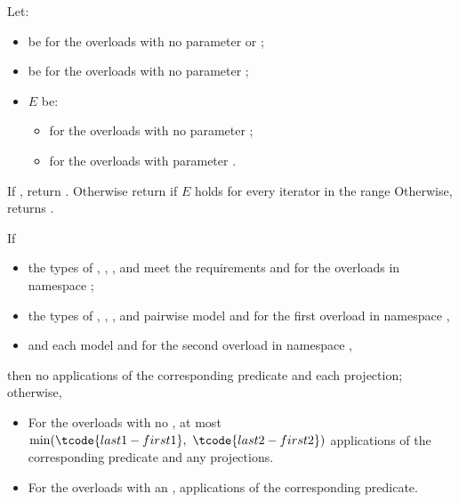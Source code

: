 \begin{itemdescr}
\pnum
Let:
\begin{itemize}
\item
   be 
  for the overloads with no parameter  or ;
\item
   be 
  for the overloads with no parameter ;
\item
  $E$ be:
  \begin{itemize}
  \setlength{\emergencystretch}{1em}
  \item
    for the overloads with no parameter ;
  \item
    for the overloads with parameter .
  \end{itemize}
\end{itemize}

\pnum
\returns
If , return .
Otherwise return 
if $E$ holds for every iterator  in the range 
Otherwise, returns .

\pnum
\complexity
If
\begin{itemize}
\item
  the types of , , , and 
  meet the
   requirements
  and 
  for the overloads in namespace ;
\item
 the types of , , , and 
 pairwise model 
  and 
  for the first overload in namespace ,
\item
    and  each model  and
   for the second overload in namespace ,
\end{itemize}
then no applications of the corresponding predicate and each projection;
otherwise,
\begin{itemize}
\item
  For the overloads with no ,
  at most $\min(\tcode{last1 - first1}, \ \tcode{last2 - first2})$
  applications of the corresponding predicate and any projections.
\item
  For the overloads with an ,
  applications of the corresponding predicate.
\end{itemize}
\end{itemdescr}

